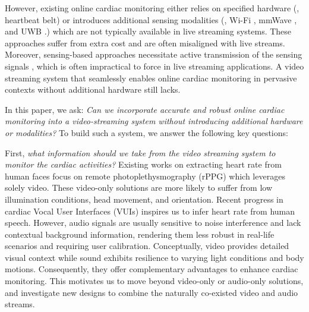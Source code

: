 However, existing online cardiac monitoring either relies on specified hardware \cite{PolarH10Polar}(\eg, heartbeat belt) or introduces additional sensing modalities (\eg, Wi-Fi \cite{liu2015tracking}, mmWave \cite{yang2016monitoring}, and UWB \cite{chen2021movi} \etc.) which are not typically available in live streaming systems.
These approaches suffer from extra cost and are often misaligned with live streams. Moreover, sensing-based approaches necessitate active transmission of the sensing signals \cite{wang2023df, qian2018acousticcardiogram}, which is often impractical to force in live streaming applications. 
A video streaming system that seamlessly enables online cardiac monitoring in pervasive contexts without additional hardware still lacks. 

In this paper, we ask: \textit{Can we incorporate accurate and robust online cardiac monitoring into a video-streaming system without introducing additional hardware or modalities?} 
To build such a system, we answer the following key questions:

First, \textit{what information should we take from the video streaming system to monitor the cardiac activities?} 
Existing works \cite{chen2018deepphys, liu2020multi, niu2020video, li2023learning, yu2019remote,yu2019remoteCompress, yu2023physformer++, liu2023efficientphys, zou2024rhythmformer} on extracting heart rate from human faces focus on remote photoplethysmography (rPPG) which leverages solely video. These video-only solutions are more likely to suffer from low illumination conditions, head movement, and orientation. 
Recent progress in cardiac Vocal User Interfaces (VUIs) \cite{xu2022hearing} inspires us to infer heart rate from human speech. However, audio signals are usually sensitive to noise interference and lack contextual background information, rendering them less robust in real-life scenarios and requiring user calibration. 
Conceptually, video provides detailed visual context while sound exhibits resilience to varying light conditions and body motions. 
Consequently, they offer complementary advantages to enhance cardiac monitoring. This motivates us to move beyond video-only or audio-only solutions, and investigate new designs to combine the naturally co-existed video and audio streams. 

